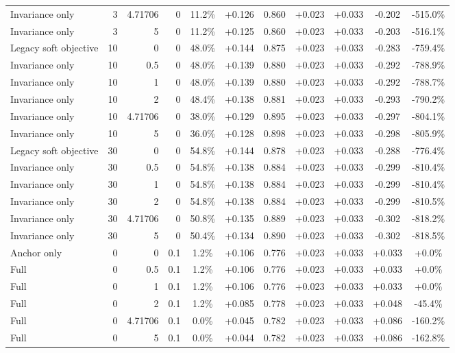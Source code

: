 \begin{table}[htbp]
\begin{tabular}{lrrrccccccc}
Invariance only & 3 & 4.71706 & 0 & 11.2\% & +0.126 & 0.860 & +0.023 & +0.033 & -0.202 & -515.0\% \\
Invariance only & 3 & 5 & 0 & 11.2\% & +0.125 & 0.860 & +0.023 & +0.033 & -0.203 & -516.1\% \\
Legacy soft objective & 10 & 0 & 0 & 48.0\% & +0.144 & 0.875 & +0.023 & +0.033 & -0.283 & -759.4\% \\
Invariance only & 10 & 0.5 & 0 & 48.0\% & +0.139 & 0.880 & +0.023 & +0.033 & -0.292 & -788.9\% \\
Invariance only & 10 & 1 & 0 & 48.0\% & +0.139 & 0.880 & +0.023 & +0.033 & -0.292 & -788.7\% \\
Invariance only & 10 & 2 & 0 & 48.4\% & +0.138 & 0.881 & +0.023 & +0.033 & -0.293 & -790.2\% \\
Invariance only & 10 & 4.71706 & 0 & 38.0\% & +0.129 & 0.895 & +0.023 & +0.033 & -0.297 & -804.1\% \\
Invariance only & 10 & 5 & 0 & 36.0\% & +0.128 & 0.898 & +0.023 & +0.033 & -0.298 & -805.9\% \\
Legacy soft objective & 30 & 0 & 0 & 54.8\% & +0.144 & 0.878 & +0.023 & +0.033 & -0.288 & -776.4\% \\
Invariance only & 30 & 0.5 & 0 & 54.8\% & +0.138 & 0.884 & +0.023 & +0.033 & -0.299 & -810.4\% \\
Invariance only & 30 & 1 & 0 & 54.8\% & +0.138 & 0.884 & +0.023 & +0.033 & -0.299 & -810.4\% \\
Invariance only & 30 & 2 & 0 & 54.8\% & +0.138 & 0.884 & +0.023 & +0.033 & -0.299 & -810.5\% \\
Invariance only & 30 & 4.71706 & 0 & 50.8\% & +0.135 & 0.889 & +0.023 & +0.033 & -0.302 & -818.2\% \\
Invariance only & 30 & 5 & 0 & 50.4\% & +0.134 & 0.890 & +0.023 & +0.033 & -0.302 & -818.5\% \\
Anchor only & 0 & 0 & 0.1 & 1.2\% & +0.106 & 0.776 & +0.023 & +0.033 & +0.033 & +0.0\% \\
Full & 0 & 0.5 & 0.1 & 1.2\% & +0.106 & 0.776 & +0.023 & +0.033 & +0.033 & +0.0\% \\
Full & 0 & 1 & 0.1 & 1.2\% & +0.106 & 0.776 & +0.023 & +0.033 & +0.033 & +0.0\% \\
Full & 0 & 2 & 0.1 & 1.2\% & +0.085 & 0.778 & +0.023 & +0.033 & +0.048 & -45.4\% \\
Full & 0 & 4.71706 & 0.1 & 0.0\% & +0.045 & 0.782 & +0.023 & +0.033 & +0.086 & -160.2\% \\
Full & 0 & 5 & 0.1 & 0.0\% & +0.044 & 0.782 & +0.023 & +0.033 & +0.086 & -162.8\% \\

\end{tabular}
\end{table}
